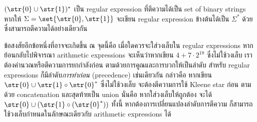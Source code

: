 \begin{example}
$(\str{0}\cup\str{1})^*$ เป็น regular expression ที่ตีความได้เป็น set of binary strings \enskip หากให้ $\Sigma=\set{\str{0},\str{1}}$ จะเขียน regular expression ข้างต้นได้เป็น $\Sigma^*$ ด้วย ซึ่งสามารถตีความได้อย่างเดียวกัน
\end{example}

ข้อสงสัยอีกข้อหนึ่งที่อาจจะเกิดขึ้น ณ จุดนี้คือ เมื่อใดควรจะใส่วงเล็บใน regular expressions \enskip หากย้อนกลับไปพิจารณา arithmetic expressions จะเห็นว่าหากเขียน $4+7\cdot 2^{18}$ ซึ่งไม่ใช้วงเล็บ เราต้องคำนวณหรือตีความการยกกำลังก่อน ตามด้วยการคูณและการบวกให้เป็นลำดับ \enskip สำหรับ regular expressions ก็มีลำดับ\emph{การทำก่อน} (precedence) เช่นเดียวกัน กล่าวคือ หากเขียน $\str{0}\cup\str{1}\circ\str{0}^*$ ซึ่งไม่ใช้วงเล็บ จะต้องตีความการใช้ Kleene star ก่อน ตามด้วย concatenation และสุดท้ายเป็น union \enskip นั่นคือ หากใส่วงเล็บให้ถูกต้อง จะได้ $\str{0}\cup(\str{1}\circ(\str{0}^*))$ \enskip ทั้งนี้ หากต้องการเปลี่ยนแปลงลำดับการตีความ ก็สามารถใช้วงเล็บกำหนดในลักษณะเดียวกับ arithmetic expressions ได้

